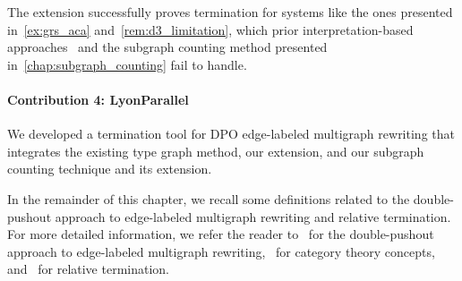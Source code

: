 The extension successfully proves termination for systems like the ones presented 
in~\autoref{ex:grs_aca} and~\autoref{rem:d3_limitation}, which prior interpretation-based approaches~\cite{zantema2014termination,bruggink2014termination,bruggink2015proving,endrullis2024generalized_arxiv_v2,overbeek2024termination_lmcs} and the subgraph counting method presented in~\autoref{chap:subgraph_counting} fail to handle. 

\paragraph{Contribution 4: LyonParallel}
We developed a termination tool for DPO edge-labeled multigraph rewriting that integrates the existing type graph method, our extension, and our subgraph counting technique and its extension.

In the remainder of this chapter, we recall some definitions related to the double-pushout approach to edge-labeled multigraph rewriting and relative termination. For more detailed information, we refer the reader to~\cite{konig2018atutorial,corradini1997algebraic} for the double-pushout approach to edge-labeled multigraph rewriting,~\cite{pierce1991basic,barr1990category} for category theory concepts, and~\cite{geser1990relative} for relative termination. 